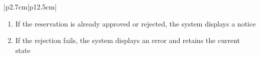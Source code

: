 \begin{table}[H]
\begin{tabular}{|p{2.7cm}|p{12.5cm}|}
\begin{minipage}[t]{\linewidth}
\begin{enumerate}[topsep=0pt,itemsep=1pt,parsep=0pt,partopsep=0pt]
                                          \item If the reservation is already approved or rejected, the system displays a
                                                notice
                                          \item If the rejection fails, the system displays an error and retains the current
                                                state
                                      \end{enumerate}
                                  \end{minipage} \\
        \hline
    \end{tabular}
    \label{tab:admin-reject-usb-reservation}
\end{table}
